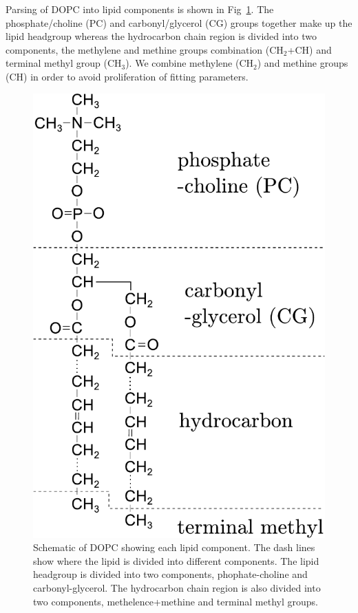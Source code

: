 \documentclass[12pt,letterpaper]{article}
\newcommand{\CH}[1]{\textrm{CH}_#1}
\begin{document}
Parsing of DOPC into lipid components is shown in
Fig~\ref{fig:dopc_schematic}. The phosphate/choline (PC) and 
carbonyl/glycerol (CG) groups together make up the lipid headgroup
whereas the hydrocarbon chain region
is divided into two components, the methylene and methine groups 
combination ($\CH{2}$+CH) and terminal methyl group ($\CH{3}$). 
We combine methylene ($\CH{2}$) and methine groups (CH) in order to avoid 
proliferation of 
fitting parameters.
\begin{figure}[htbp]
  \centering
  \includegraphics[scale=0.7]{./figures/dopc_schematic.pdf}
  \caption{Schematic of DOPC showing each lipid component. The dash lines 
           show where the lipid is divided into different components. 
           The lipid headgroup
           is divided into two components, phophate-choline and carbonyl-glycerol. 
           The hydrocarbon chain region is also divided
           into two components, methelence+methine and terminal methyl groups.}
  \label{fig:dopc_schematic}
\end{figure}
\end{document}
